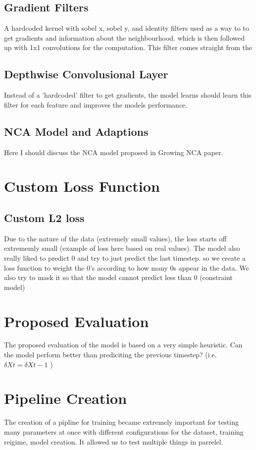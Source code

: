 \subsection{Gradient Filters}
A hardcoded kernel with sobel x, sobel y, and identity filters used as a way to to get gradients and information about the neighbourhood. which is then followed up with 1x1 convolutions for the computation. This filter comes straight from the \cite{growing_nca}

\subsection{Depthwise Convolusional Layer}
Instead of a 'hardcoded' filter to get gradients, the model learns should learn this filter for each feature and improves the models performance.


\subsection{NCA Model and Adaptions}
Here I should discuss the NCA model proposed in Growing NCA paper. 

\section{Custom Loss Function}
\subsection{Custom L2 loss}
Due to the nature of the data (extremely small values), the loss starts off extrememly small (example of loss here based on real values). The model also really liked to predict 0 and try to just predict the last timestep. so we create a loss function to weight the 0's according to how many 0s appear in the data. We also try to mask it so that the model cannot predict less than 0 (constraint model)
\section{Proposed Evaluation}
The proposed evaluation of the model is based on a very simple heuristic. Can the model perform better than prediciting the previous timestep? (i.e. $\delta{Xt} = \delta{Xt-1}$ )
\section{Pipeline Creation}
The creation of a pipline for training became extremely important for testing many parameters at once with different configurations for the dataset, training reigime, model creation. It allowed us to test multiple things in parrelel.